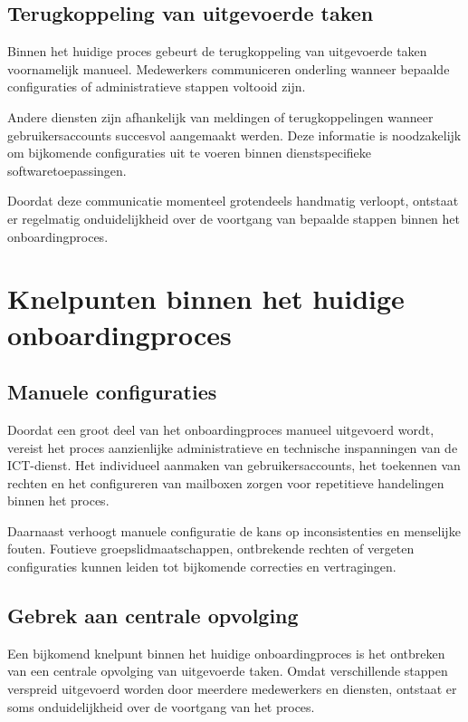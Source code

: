 \subsection{Terugkoppeling van uitgevoerde taken}

Binnen het huidige proces gebeurt de terugkoppeling van uitgevoerde taken voornamelijk manueel. Medewerkers communiceren onderling wanneer bepaalde configuraties of administratieve stappen voltooid zijn.

Andere diensten zijn afhankelijk van meldingen of terugkoppelingen wanneer gebruikersaccounts succesvol aangemaakt werden. Deze informatie is noodzakelijk om bijkomende configuraties uit te voeren binnen dienstspecifieke softwaretoepassingen.

Doordat deze communicatie momenteel grotendeels handmatig verloopt, ontstaat er regelmatig onduidelijkheid over de voortgang van bepaalde stappen binnen het onboardingproces.

\section{Knelpunten binnen het huidige onboardingproces}

\subsection{Manuele configuraties}

Doordat een groot deel van het onboardingproces manueel uitgevoerd wordt, vereist het proces aanzienlijke administratieve en technische inspanningen van de ICT-dienst. Het individueel aanmaken van gebruikersaccounts, het toekennen van rechten en het configureren van mailboxen zorgen voor repetitieve handelingen binnen het proces.

Daarnaast verhoogt manuele configuratie de kans op inconsistenties en menselijke fouten. Foutieve groepslidmaatschappen, ontbrekende rechten of vergeten configuraties kunnen leiden tot bijkomende correcties en vertragingen.

\subsection{Gebrek aan centrale opvolging}

Een bijkomend knelpunt binnen het huidige onboardingproces is het ontbreken van een centrale opvolging van uitgevoerde taken. Omdat verschillende stappen verspreid uitgevoerd worden door meerdere medewerkers en diensten, ontstaat er soms onduidelijkheid over de voortgang van het proces.

